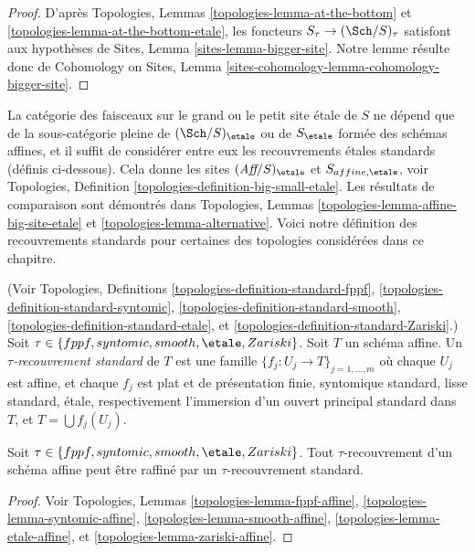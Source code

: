 \begin{proof}
D'apr\`es
Topologies, Lemmas \ref{topologies-lemma-at-the-bottom} et
\ref{topologies-lemma-at-the-bottom-etale},
les foncteurs $S_\tau \to (\Sch/S)_\tau$
satisfont aux hypoth\`eses de
Sites, Lemma \ref{sites-lemma-bigger-site}.
Notre lemme r\'esulte donc de
Cohomology on Sites, Lemma \ref{sites-cohomology-lemma-cohomology-bigger-site}.
\end{proof}

\noindent
La cat\'egorie des faisceaux sur le grand ou le petit site \'etale de $S$ ne d\'epend que
de la sous-cat\'egorie pleine de $(\Sch/S)_\etale$ ou de $S_\etale$ form\'ee des
sch\'emas affines, et il suffit de consid\'erer entre eux les recouvrements \'etales standards
(d\'efinis ci-dessous). Cela donne les sites
$(\textit{Aff}/S)_\etale$ et $S_{affine, \etale}$, voir
Topologies, Definition \ref{topologies-definition-big-small-etale}.
Les r\'esultats de comparaison sont d\'emontr\'es dans Topologies,
Lemmas \ref{topologies-lemma-affine-big-site-etale} et
\ref{topologies-lemma-alternative}. Voici notre d\'efinition des
recouvrements standards pour certaines des topologies consid\'er\'ees dans ce chapitre.

\begin{definition}
\label{definition-standard-tau}
(Voir
Topologies, Definitions
\ref{topologies-definition-standard-fppf},
\ref{topologies-definition-standard-syntomic},
\ref{topologies-definition-standard-smooth},
\ref{topologies-definition-standard-etale}, et
\ref{topologies-definition-standard-Zariski}.)
Soit $\tau \in \{fppf, syntomic, smooth, \etale, Zariski\}$.
Soit $T$ un sch\'ema affine.
Un {\it $\tau$-recouvrement standard} de $T$ est une famille
$\{f_j : U_j \to T\}_{j = 1, \ldots, m}$ o\`u chaque $U_j$ est affine,
et chaque $f_j$ est plat et de pr\'esentation finie,
syntomique standard, lisse standard, \'etale, respectivement l'immersion d'un
ouvert principal standard dans $T$, et $T = \bigcup f_j(U_j)$.
\end{definition}

\begin{lemma}
\label{lemma-tau-affine}
Soit $\tau \in \{fppf, syntomic, smooth, \etale, Zariski\}$.
Tout $\tau$-recouvrement d'un sch\'ema affine peut \^etre raffin\'e par un
$\tau$-recouvrement standard.
\end{lemma}

\begin{proof}
Voir
Topologies, Lemmas
\ref{topologies-lemma-fppf-affine},
\ref{topologies-lemma-syntomic-affine},
\ref{topologies-lemma-smooth-affine},
\ref{topologies-lemma-etale-affine}, et
\ref{topologies-lemma-zariski-affine}.
\end{proof}

